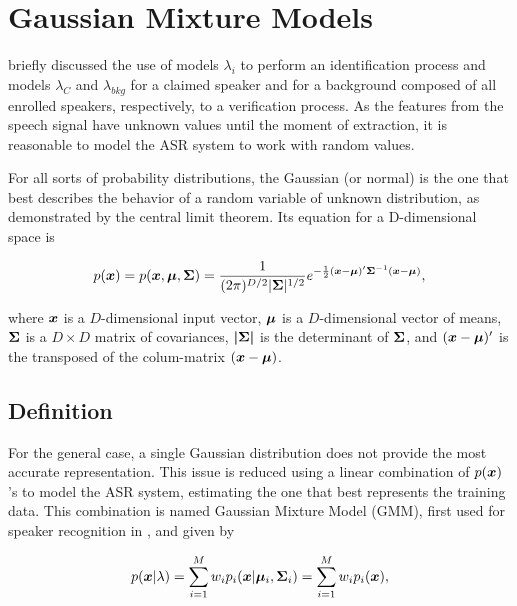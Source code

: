\chapter{Gaussian Mixture Models}
\label{ch:gmm}

 briefly discussed the use of models $\lambda_i$ to perform an identification process and models $\lambda_{C}$ and $\lambda_{bkg}$ for a claimed speaker and for a background composed of all enrolled speakers, respectively, to a verification process. As the features from the speech signal have unknown values until the moment of extraction, it is reasonable to model the ASR system to work with random values.

For all sorts of probability distributions, the Gaussian (or normal) is the one that best describes the behavior of a random variable of unknown distribution, as demonstrated by the central limit theorem. Its equation for a D-dimensional space is

\begin{equation}
    \pdf{\dvec{x}} = p(\dvec{x},\dvec{\mu},\dvec{\Sigma}) = \dgaussian{x}{\mu}{\Sigma},
    \label{eq:gaussian}
\end{equation}

\noindent where $\boldsymbol{x}$ is a $D$-dimensional input vector, $\boldsymbol{\mu}$ is a $D$-dimensional vector of means, $\boldsymbol{\Sigma}$ is a $D \times D$ matrix of covariances, $\boldsymbol{|\Sigma|}$ is the determinant of $\boldsymbol{\Sigma}$, and $(\boldsymbol{x} - \boldsymbol{\mu})'$ is the transposed of the colum-matrix $(\boldsymbol{x} - \boldsymbol{\mu})$.

\section{Definition}
\label{sec:gmm-definition}

For the general case, a single Gaussian distribution does not provide the most accurate representation. This issue is reduced using a linear combination of $p(\boldsymbol{x})$'s to model the ASR system, estimating the one that best represents the training data. This combination is named Gaussian Mixture Model (GMM), first used for speaker recognition in , and given by

\begin{equation}
    \postpdf{\dvec{x}}{\lambda} = \sum_{i=1}^M w_i\postpdfi{\dvec{x}}{\dvec{\mu}_i, \dvec{\Sigma}_i} = \sum_{i=1}^M w_i\pdfi{\dvec{x}},
    \label{eq:gaussian_mixture}
\end{equation}

